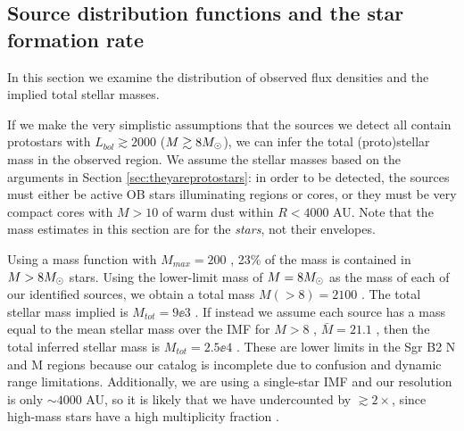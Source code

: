 \documentclass[twocolumn]{aastex61}
\begin{document}
\subsection{Source distribution functions and the star formation rate}
\label{sec:distributionsandsfr}

In this section we examine the distribution of observed flux densities and the
implied total stellar masses.  


If we make the very simplistic assumptions that the sources we detect all
contain protostars with $L_{bol}\gtrsim2000$ \lsun ($M\gtrsim8 M_{\odot}$), we
can infer the total (proto)stellar mass in the observed region.  We assume the
stellar masses based on the arguments in Section \ref{sec:theyareprotostars}:
in order to be detected, the sources must either be active OB stars
illuminating \hii regions or cores, or they must be very compact cores with
$M>10$ \msun of warm dust within $R<4000$ AU.  Note that the mass estimates in
this section are for the \emph{stars}, not their envelopes.

Using a \citet{Kroupa2001a} mass function with $M_{max}=200$ \msun, 23\% of the
mass is contained in $M>8M_{\odot}$ stars.  Using the lower-limit mass
of $M=8M_{\odot}$ as the mass of each of our \ncores identified sources, we
obtain a total mass $M(>8)=2100$ \msun.  The total stellar mass implied is
$M_{tot} = 9\ee{3}$ \msun.  If instead we assume each source has a mass equal
to the mean stellar mass over the IMF for $M>8$ \msun, $\bar{M}=21.1$ \msun,
then the total inferred stellar mass is $M_{tot}=2.5\ee{4}$ \msun.  These are
lower limits in the Sgr B2 N and M regions because our catalog is incomplete
due to confusion and dynamic range limitations.  Additionally, we are using a
single-star IMF and our resolution is only $\sim4000$ AU, so it is likely that
we have undercounted by $\gtrsim2\times$, since high-mass stars have a high
multiplicity fraction \citep{Mason2009a}.
\end{document}
